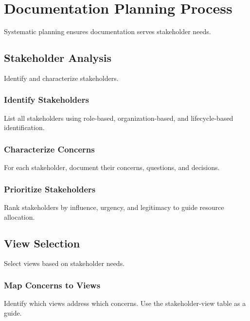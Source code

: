 \documentclass[11pt]{article}
\begin{document}
\section{Documentation Planning Process}

Systematic planning ensures documentation serves stakeholder needs.

\subsection{Stakeholder Analysis}

Identify and characterize stakeholders.

\subsubsection{Identify Stakeholders}

List all stakeholders using role-based, organization-based, and lifecycle-based identification.

\subsubsection{Characterize Concerns}

For each stakeholder, document their concerns, questions, and decisions.

\subsubsection{Prioritize Stakeholders}

Rank stakeholders by influence, urgency, and legitimacy to guide resource allocation.

\subsection{View Selection}

Select views based on stakeholder needs.

\subsubsection{Map Concerns to Views}

Identify which views address which concerns. Use the stakeholder-view table as a guide.
\end{document}
